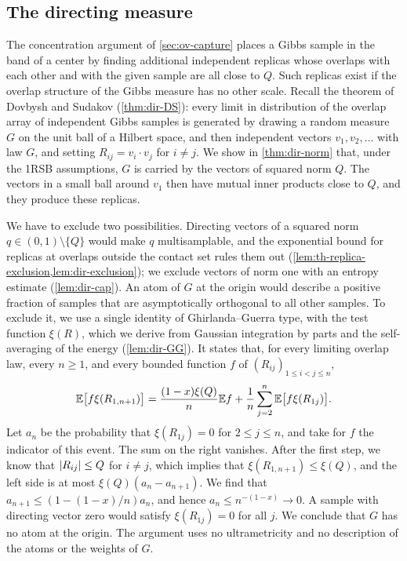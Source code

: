 \subsection{The directing measure}\label{sec:ov-directing}

The concentration argument of \cref{sec:ov-capture} places a Gibbs sample in the band of a center by finding additional independent replicas whose overlaps with each other and with the given sample are all close to $Q$. Such replicas exist if the overlap structure of the Gibbs measure has no other scale. Recall the theorem of Dovbysh and Sudakov (\cref{thm:dir-DS}): every limit in distribution of the overlap array of independent Gibbs samples is generated by drawing a random measure $G$ on the unit ball of a Hilbert space, and then independent vectors $v_1,v_2,\dots$ with law $G$, and setting $R_{ij}=v_i\cdot v_j$ for $i\ne j$. We show in \cref{thm:dir-norm} that, under the 1RSB assumptions, $G$ is carried by the vectors of squared norm $Q$. The vectors in a small ball around $v_1$ then have mutual inner products close to $Q$, and they produce these replicas.

We have to exclude two possibilities. Directing vectors of a squared norm $q\in(0,1)\setminus\{Q\}$ would make $q$ multisamplable, and the exponential bound for replicas at overlaps outside the contact set rules them out (\cref{lem:th-replica-exclusion,lem:dir-exclusion}); we exclude vectors of norm one with an entropy estimate (\cref{lem:dir-cap}). An atom of $G$ at the origin would describe a positive fraction of samples that are asymptotically orthogonal to all other samples. To exclude it, we use a single identity of Ghirlanda--Guerra type, with the test function $\xi(R)$, which we derive from Gaussian integration by parts and the self-averaging of the energy (\cref{lem:dir-GG}). It states that, for every limiting overlap law, every $n\ge1$, and every bounded function $f$ of $(R_{ij})_{1\le i<j\le n}$,
\begin{equation}\label{eq:ov-GG}
\mathbb E\bigl[f\xi(R_{1,n+1})\bigr]=\frac{(1-x)\xi(Q)}n\mathbb E f+\frac1n\sum_{j=2}^n\mathbb E\bigl[f\xi(R_{1j})\bigr].
\end{equation}
Let $a_n$ be the probability that $\xi(R_{1j})=0$ for $2\le j\le n$, and take for $f$ the indicator of this event. The sum on the right vanishes. After the first step, we know that $\left|R_{ij}\right|\le Q$ for $i\ne j$, which implies that $\xi(R_{1,n+1})\le\xi(Q)$, and the left side is at most $\xi(Q)(a_n-a_{n+1})$. We find that $a_{n+1}\le(1-(1-x)/n)a_n$, and hence $a_n\le n^{-(1-x)}\to0$. A sample with directing vector zero would satisfy $\xi(R_{1j})=0$ for all $j$. We conclude that $G$ has no atom at the origin. The argument uses no ultrametricity and no description of the atoms or the weights of $G$.

